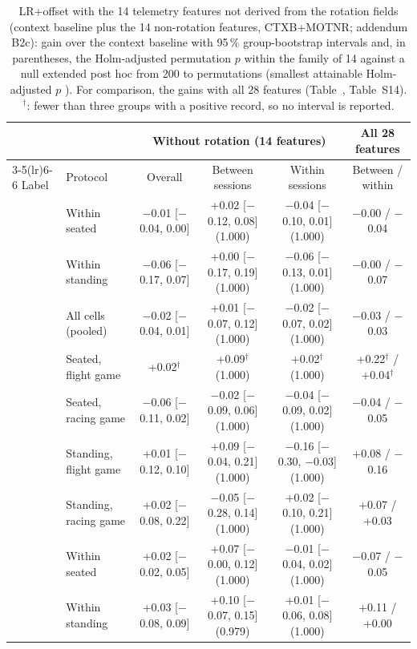 \begin{table}[ht]
\centering
\scriptsize
\caption{LR+offset with the 14 telemetry features not derived from the rotation fields (context baseline plus the 14 non-rotation features, CTXB+MOTNR; addendum B2c): gain over the context baseline with 95\,\% group-bootstrap intervals and, in parentheses, the Holm-adjusted permutation $p$ within the family of 14 against a null extended post hoc from 200 to  permutations (smallest attainable Holm-adjusted $p$ ). For comparison, the gains with all 28 features (Table~, Table~S14). $^\dagger$: fewer than three groups with a positive record, so no interval is reported.}
\label{tab:supp_nr}
\setlength{\tabcolsep}{3pt}
\begin{tabular}{@{}llcccc@{}}
\toprule
 & & \multicolumn{3}{c}{Without rotation (14 features)} & All 28 features \\
\cmidrule(lr){3-5}\cmidrule(lr){6-6}
Label & Protocol & Overall & Between sessions & Within sessions & Between / within \\
\midrule
\sevtwo{} & Within seated & $-$0.01 [$-$0.04, 0.00] & +0.02 [$-$0.12, 0.08] (1.000) & $-$0.04 [$-$0.10, 0.01] (1.000) & $-$0.00 / $-$0.04 \\
 & Within standing & $-$0.06 [$-$0.17, 0.07] & +0.00 [$-$0.17, 0.19] (1.000) & $-$0.06 [$-$0.13, 0.01] (1.000) & $-$0.00 / $-$0.07 \\
 & All cells (pooled) & $-$0.02 [$-$0.04, 0.01] & +0.01 [$-$0.07, 0.12] (1.000) & $-$0.02 [$-$0.07, 0.02] (1.000) & $-$0.03 / $-$0.03 \\
 & Seated, flight game & +0.02$^\dagger$ & +0.09$^\dagger$ (1.000) & +0.02$^\dagger$ (1.000) & +0.22$^\dagger$ / +0.04$^\dagger$ \\
 & Seated, racing game & $-$0.06 [$-$0.11, 0.02] & $-$0.02 [$-$0.09, 0.06] (1.000) & $-$0.04 [$-$0.09, 0.02] (1.000) & $-$0.04 / $-$0.05 \\
 & Standing, flight game & +0.01 [$-$0.12, 0.10] & +0.09 [$-$0.04, 0.21] (1.000) & $-$0.16 [$-$0.30, $-$0.03] (1.000) & +0.08 / $-$0.16 \\
 & Standing, racing game & +0.02 [$-$0.08, 0.22] & $-$0.05 [$-$0.28, 0.14] (1.000) & +0.02 [$-$0.10, 0.21] (1.000) & +0.07 / +0.03 \\
\midrule
\sevone{} & Within seated & +0.02 [$-$0.02, 0.05] & +0.07 [$-$0.00, 0.12] (1.000) & $-$0.01 [$-$0.04, 0.02] (1.000) & $-$0.07 / $-$0.05 \\
 & Within standing & +0.03 [$-$0.08, 0.09] & +0.10 [$-$0.07, 0.15] (0.979) & +0.01 [$-$0.06, 0.08] (1.000) & +0.11 / +0.00 \\

\end{tabular}
\end{table}
